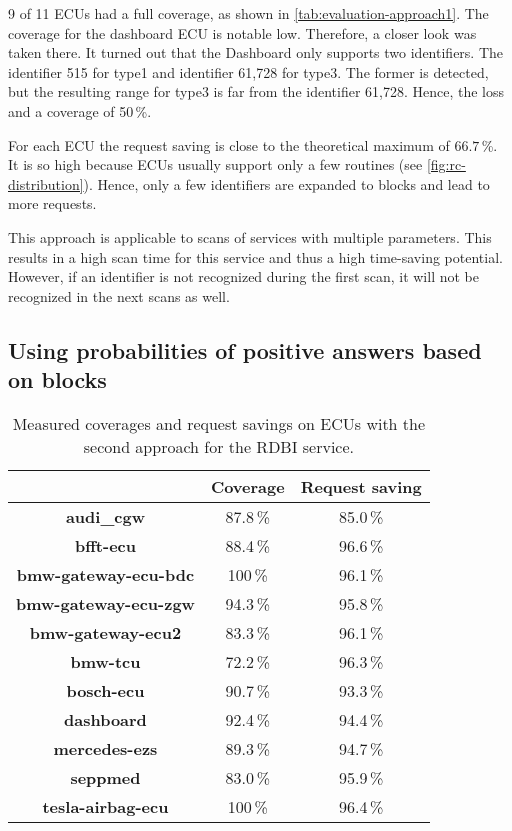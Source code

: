 9 of 11 ECUs had a full coverage, as shown in \autoref{tab:evaluation-approach1}. The coverage for the dashboard ECU is notable low. Therefore, a closer look was taken there. It turned out that the Dashboard only supports two identifiers. The identifier 515 for type1 and identifier 61,728 for type3. The former is detected, but the resulting range for type3 is far from the identifier 61,728. Hence, the loss and a coverage of 50\,\%.

For each ECU the request saving is close to the theoretical maximum of $66.7$\,\%. It is so high because ECUs usually support only a few routines (see \autoref{fig:rc-distribution}). Hence, only a few identifiers are expanded to blocks and lead to more requests.

This approach is applicable to scans of services with multiple parameters. This results in a high scan time for this service and thus a high time-saving potential. However, if an identifier is not recognized during the first scan, it will not be recognized in the next scans as well.


\subsection{Using probabilities of positive answers based on blocks}

\begin{table}[H]
    \begin{center}
    \begin{tabular}{ccc}
        \hline
        & \textbf{Coverage} & \textbf{Request saving} \\
        \hline
        \textbf{audi\_cgw} & 87.8\,\% & 85.0\,\% \\
        \textbf{bfft-ecu} & 88.4\,\% & 96.6\,\% \\
        \textbf{bmw-gateway-ecu-bdc} & 100\,\% & 96.1\,\% \\
        \textbf{bmw-gateway-ecu-zgw} & 94.3\,\% & 95.8\,\% \\
        \textbf{bmw-gateway-ecu2} & 83.3\,\% & 96.1\,\% \\
        \textbf{bmw-tcu} & 72.2\,\% & 96.3\,\% \\
        \textbf{bosch-ecu} & 90.7\,\% & 93.3\,\% \\
        \textbf{dashboard} & 92.4\,\% & 94.4\,\% \\
        \textbf{mercedes-ezs} & 89.3\,\% & 94.7\,\% \\
        \textbf{seppmed} & 83.0\,\% & 95.9\,\% \\
        \textbf{tesla-airbag-ecu} & 100\,\% & 96.4\,\% \\
        \hline
    \end{tabular}
    \end{center}
    \caption{Measured coverages and request savings on ECUs with the second approach for the RDBI service.}
    \label{tab:evaluation-approach2}
\end{table}

